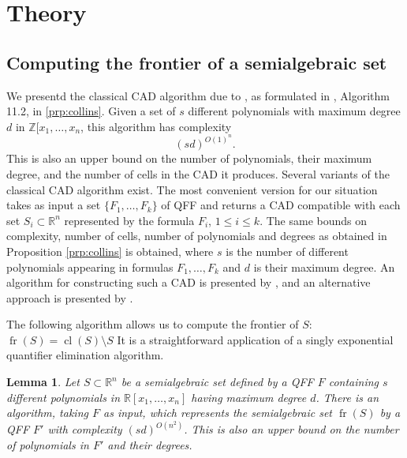 \documentclass[
]{book}
\newtheorem{lemma}{Lemma}[chapter]
\theoremstyle{definition}
\theoremstyle{definition}
\theoremstyle{definition}
\theoremstyle{definition}
\theoremstyle{remark}
\begin{document}
\hypertarget{theory}{%
\section{Theory}\label{theory}}

\hypertarget{computing-the-frontier-of-a-semialgebraic-set}{%
\subsection{Computing the frontier of a semialgebraic set}\label{computing-the-frontier-of-a-semialgebraic-set}}

We presentd the classical CAD algorithm due to \citet{collins1975}, as formulated in \citet{bpr2006}, Algorithm 11.2, in \ref{prp:collins}.
Given a set of \(s\) different polynomials with maximum degree \(d\) in \(\mathbb{Z}[x_1,\ldots,x_n\), this algorithm has complexity
\[
(sd)^{O(1)^{n}}.
\]
This is also an upper bound on the number of polynomials, their maximum degree, and the number of cells in the CAD it produces.
Several variants of the classical CAD algorithm exist. The most convenient version for our situation takes as input a set \(\{ F_1,\ldots,F_k \}\) of QFF and returns a CAD compatible with each set \(S_i \subset \mathbb{R}^n\) represented by the formula \(F_i\), \(1 \le i \le k\). The same bounds on complexity, number of cells, number of polynomials and degrees as obtained in Proposition \ref{prp:collins} is obtained, where \(s\) is the number of different polynomials appearing in formulas \(F_1,\ldots,F_k\) and \(d\) is their maximum degree.
An algorithm for constructing such a CAD is presented by \citet{collins1991}, and an alternative approach is presented by \citet{bradford2014}.

The following algorithm allows us to compute the frontier of \(S\): \({\operatorname{fr} \left( S \right)}={\operatorname{cl} \left( S \right)} \setminus S\)
It is a straightforward application of a singly exponential quantifier elimination algorithm.

\begin{lemma}
\protect\hypertarget{lem:frontier}{}\label{lem:frontier}Let \(S \subset \mathbb{R}^n\) be a semialgebraic set defined by a QFF \(F\)
containing \(s\) different polynomials in \(\mathbb{R}[x_1, \ldots ,x_n]\) having maximum degree \(d\).
There is an algorithm, taking \(F\) as input, which represents the semialgebraic set \({\operatorname{fr} \left( S \right)}\) by a QFF \(F'\) with complexity \((sd)^{O(n^2)}\).
This is also an upper bound on the number of polynomials in \(F'\) and their degrees.
\end{lemma}
\end{document}
